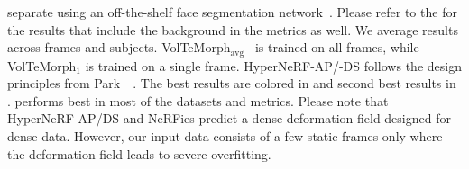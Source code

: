 \begin{table*}[!t]
{    separate using an off-the-shelf face segmentation
    network~\cite{wood2021fake}.
    Please refer to the \supplementary{} for the results that include the
    background in the metrics as well.
    We average results across frames and subjects.
    VolTeMorph$_{\text{avg}}$~\cite{garbin2024voltemorph} is trained on all
    frames, while VolTeMorph$_1$ is trained on a single frame.
    HyperNeRF-AP/-DS follows the design principles from
    Park~\etal~\cite{park2021hypernerf}.
    The best results are colored in  and second
    best results in .
    \blendfields performs best in most of the datasets and metrics.
    Please note that HyperNeRF-AP/DS and NeRFies predict a dense deformation
    field designed for dense data.
    However, our input data consists of a few static frames only where the
    deformation field leads to severe overfitting.
  }
  \label{tab:blendfields-quantitative-results}
\end{table*}


